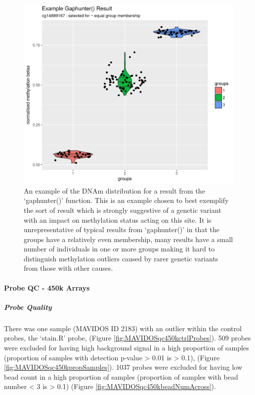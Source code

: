 \documentclass[]{book}
\let\oldparagraph\paragraph
\renewcommand{\paragraph}[1]{\oldparagraph{#1}\mbox{}}
\let\oldsubparagraph\subparagraph
\renewcommand{\subparagraph}[1]{\oldsubparagraph{#1}\mbox{}}
\begin{document}
\begin{figure}

{\centering \includegraphics[width=0.8\linewidth]{figs/MAVIDOSgaphunterEgMonApr162018} 

}

\caption{An example of the DNAm distribution for a result from the `gaphunter()' function. This is an example chosen to best exemplify the sort of result which is strongly suggestive of a genetic variant with an impact on methylation status acting on this site. It is unrepresentative of typical results from `gaphunter()' in that the groups have a relatively even membership, many results have a small number of individuals in one or more groups making it hard to distinguish methylation outliers caused by rarer genetic variants from those with other causes.}\label{fig:MAVIDOSgaphunterEgMonApr162018}
\end{figure}



\hypertarget{probe-qc---450k-arrays}{%
\paragraph{Probe QC - 450k Arrays}\label{probe-qc---450k-arrays}}

\hypertarget{probe-quality-1}{%
\subparagraph{Probe Quality}\label{probe-quality-1}}

There was one sample (MAVIDOS ID 2183) with an outlier within the control probes, the `stain.R' probe, (Figure \ref{fig:MAVIDOSqc450kctrlProbes}). 509 probes were excluded for having high background signal in a high proportion of samples (proportion of samples with detection p-value \textgreater{} 0.01 is \textgreater{} 0.1), (Figure \ref{fig:MAVIDOSqc450kpropSamples}). 1037 probes were excluded for having low bead count in a high proportion of samples (proportion of samples with bead number \textless{} 3 is \textgreater{} 0.1) (Figure \ref{fig:MAVIDOSqc450kbeadNumAcross}).
\end{document}

